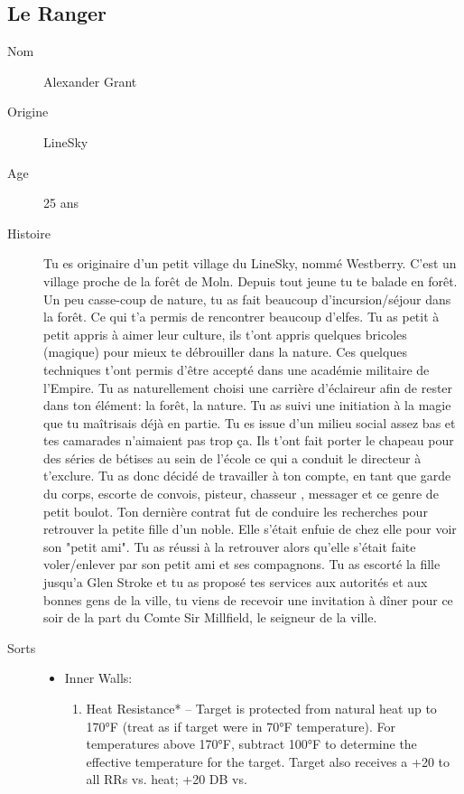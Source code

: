 \documentclass[oneside,12pt]{book}
\begin{document}
\begin{flushleft}
\subsection{Le Ranger}
\begin{description}
\item[Nom]{Alexander Grant }
\item[Origine]{LineSky}
\item[Age]{25 ans}
\item[Histoire]{
\small Tu es originaire d'un petit village du LineSky, nommé Westberry. C'est un village proche de la forêt de Moln. Depuis tout jeune tu te balade en forêt. Un peu casse-coup de nature, tu as fait beaucoup d'incursion/séjour dans la forêt. Ce qui t'a permis de rencontrer beaucoup d'elfes. Tu as petit à petit appris à aimer leur culture, ils t'ont appris quelques bricoles (magique) pour mieux te débrouiller dans la nature. Ces quelques techniques t'ont permis d'être accepté dans une académie militaire de l'Empire. Tu as naturellement choisi une carrière d'éclaireur afin de rester dans ton élément: la forêt, la nature. Tu as suivi une initiation à la magie que tu maîtrisais déjà en partie. Tu es issue d'un milieu social assez bas et tes camarades n'aimaient pas trop ça.  Ils t'ont fait porter le chapeau pour des séries de bétises au sein de l'école ce qui a conduit le directeur à t'exclure. Tu as donc décidé de travailler à ton compte, en tant que garde du corps, escorte de convois, pisteur, chasseur , messager et ce genre de petit boulot.  Ton dernière contrat fut de conduire les recherches pour retrouver la petite fille d'un noble. Elle s'était enfuie de chez elle pour voir son "petit ami". Tu as réussi à la retrouver alors qu'elle s'était faite voler/enlever par son petit ami et ses compagnons. Tu as escorté la fille jusqu'a Glen Stroke et tu as proposé tes services aux autorités et aux bonnes gens de la ville, tu viens de recevoir une invitation à dîner pour ce soir de la part du Comte Sir Millfield, le seigneur de la ville.}
\item[Sorts]{
\begin{itemize}
\item Inner Walls:
\begin{enumerate}
\scriptsize
\item Heat Resistance* –  Target is protected from natural heat
up to 170°F (treat as if target were in 70°F temperature).
For temperatures above 170°F, subtract 100°F to
determine the effective temperature for the target. Target
also receives a +20 to all RRs vs. heat; +20 DB vs.

\end{enumerate}
\end{itemize}}
\end{description}
\end{flushleft}
\end{document}

